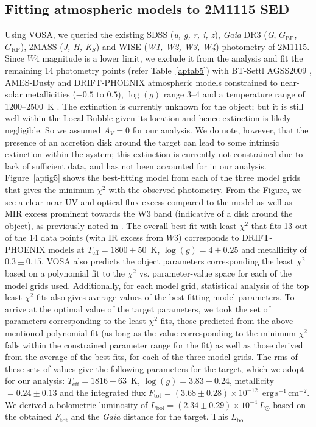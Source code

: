 \documentclass{aa}
\newcommand{\lsun}{\ensuremath{L_\odot}\xspace}
\newcommand{\Teff}{\ensuremath{T_{\mathrm{eff}}}\xspace}
\newcommand{\Lbol}{\ensuremath{L_{\mathrm{bol}}}\xspace}
\newcommand{\fluxinteg}{\ensuremath{\mathrm{erg\,s^{-1}\,cm^{-2}}}\xspace}
\begin{document}
\begin{appendix}
\section{Fitting atmospheric models to 2M1115 SED}\label{sed}
Using VOSA, we queried the existing SDSS (\textit{u, g, r, i, z}), \textit{Gaia} DR3 (\textit{G}, $G_{\mathrm{BP}}$, $G_{\mathrm{RP}}$), 2MASS (\textit{J, H, K$_S$}) and WISE (\textit{W1, W2, W3, W4}) photometry of 2M1115. Since $W4$ magnitude is a lower limit, we exclude it from the analysis and fit the remaining 14 photometry points (refer Table~\ref{aptab5}) with BT-Settl AGSS2009 \citep{allard2012, allard2013}, AMES-Dusty \citep{chabrier2000, allard2001} and DRIFT-PHOENIX \citep{phoenix2003, phoenix2008, phoenix2011} atmospheric models constrained to near-solar metallicities ($-0.5$ to $0.5$), $\log(g)$ range 3--4 \citep[based on the spectral type L2$\gamma$;][]{kirkpatrick2005, theissen2018} and a temperature range of 1200--2500~K \citep[based on existing \Teff~estimate of $1724^{184}_{-38}$~K; ][]{theissen2018}. The extinction is currently unknown for the object; but it is still well within the Local Bubble given its location and hence extinction is likely negligible. So we assumed $A_V=0$ for our analysis. We do note, however, that the presence of an accretion disk around the target can lead to some intrinsic extinction within the system; this extinction is currently not constrained due to lack of sufficient data, and has not been accounted for in our analysis. Figure~\ref{apfig5} shows the best-fitting model from each of the three model grids that gives the minimum  $\chi^2$ with the observed photometry. From the Figure, we see a clear near-UV and optical flux excess compared to the model as well as MIR excess prominent towards the W3 band (indicative of a disk around the object), as previously noted in \cite{theissen2018}. The overall best-fit with least $\chi^2$ that fits 13 out of the 14 data points (with IR excess from $W3$) corresponds to DRIFT-PHOENIX models at \Teff$=1800\pm50$~K, $\log(g)=4\pm0.25$ and metallicity of $0.3\pm0.15$. VOSA also predicts the object parameters corresponding the least $\chi^2$ based on a polynomial fit to the $\chi^2$ vs. parameter-value space for each of the model grids used. Additionally, for each model grid, statistical analysis of the top least $\chi^2$ fits also gives average values of the best-fitting model parameters. To arrive at the optimal value of the target parameters, we took the set of parameters corresponding to the least $\chi^2$ fits, those predicted from the above-mentioned polynomial fit (as long as the value corresponding to the minimum $\chi^2$ falls within the constrained parameter range for the fit) as well as those derived from the average of the best-fits, for each of the three model grids. The rms of these sets of values give the following parameters for the target, which we adopt for our analysis: $\Teff=1816\pm63$~K, $\log(g)=3.83\pm0.24$, metallicity $=0.24\pm0.13$ and the integrated flux $F_{\mathrm{tot}}=(3.68\pm0.28)\times10^{-12}$~\fluxinteg. We derived a bolometric luminosity of $\Lbol=(2.34\pm0.29)\times10^{-4}\,\lsun$ based on the obtained $F_{\mathrm{tot}}$ and the \textit{Gaia} distance for the target. This \Lbol 
\end{appendix}
\end{document}
